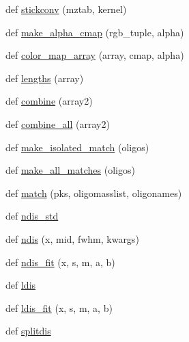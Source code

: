 \begin{DoxyCompactItemize}
\item 
def \hyperlink{namespace_uni_dec_1_1unidec__modules_1_1unidectools_a19028ab88f22b74f246ed2f43c0421ad}{stickconv} (mztab, kernel)
\item 
def \hyperlink{namespace_uni_dec_1_1unidec__modules_1_1unidectools_ad2d74bae8cb0f5d64a5837de7f8cfb00}{make\+\_\+alpha\+\_\+cmap} (rgb\+\_\+tuple, alpha)
\item 
def \hyperlink{namespace_uni_dec_1_1unidec__modules_1_1unidectools_a1a7635ec5f7253717edcf29ea4d946a8}{color\+\_\+map\+\_\+array} (array, cmap, alpha)
\item 
def \hyperlink{namespace_uni_dec_1_1unidec__modules_1_1unidectools_a2a9ff3cf4f79288f823245975fa99784}{lengths} (array)
\item 
def \hyperlink{namespace_uni_dec_1_1unidec__modules_1_1unidectools_afbf34cdc6e3932f89c994798a462bffb}{combine} (array2)
\item 
def \hyperlink{namespace_uni_dec_1_1unidec__modules_1_1unidectools_a6def0620134389f1835d8eb73c543fe6}{combine\+\_\+all} (array2)
\item 
def \hyperlink{namespace_uni_dec_1_1unidec__modules_1_1unidectools_a2842a356dd6d44a253fe98c8d42fe6f3}{make\+\_\+isolated\+\_\+match} (oligos)
\item 
def \hyperlink{namespace_uni_dec_1_1unidec__modules_1_1unidectools_ac3cbbf1369c34fce20f05dc9194059d3}{make\+\_\+all\+\_\+matches} (oligos)
\item 
def \hyperlink{namespace_uni_dec_1_1unidec__modules_1_1unidectools_a40909fc2083a6c94abd57d4ece6a1902}{match} (pks, oligomasslist, oligonames)
\item 
def \hyperlink{namespace_uni_dec_1_1unidec__modules_1_1unidectools_a534947b6ad59977af73a299ddf5e75f7}{ndis\+\_\+std}
\item 
def \hyperlink{namespace_uni_dec_1_1unidec__modules_1_1unidectools_a9ad1c6e7f38bd506a958d375de7b5ec3}{ndis} (x, mid, fwhm, kwargs)
\item 
def \hyperlink{namespace_uni_dec_1_1unidec__modules_1_1unidectools_a5f266a88a19ea420be5e0807bba54ab5}{ndis\+\_\+fit} (x, s, m, a, b)
\item 
def \hyperlink{namespace_uni_dec_1_1unidec__modules_1_1unidectools_a6c6c6918c266fadeebd6ac4ce49d12ab}{ldis}
\item 
def \hyperlink{namespace_uni_dec_1_1unidec__modules_1_1unidectools_a2b9d4075681154ced9d7b365bd9f662c}{ldis\+\_\+fit} (x, s, m, a, b)
\item 
def \hyperlink{namespace_uni_dec_1_1unidec__modules_1_1unidectools_aa27cc539811f61b66efb1bba043201eb}{splitdis}

\end{DoxyCompactItemize}
